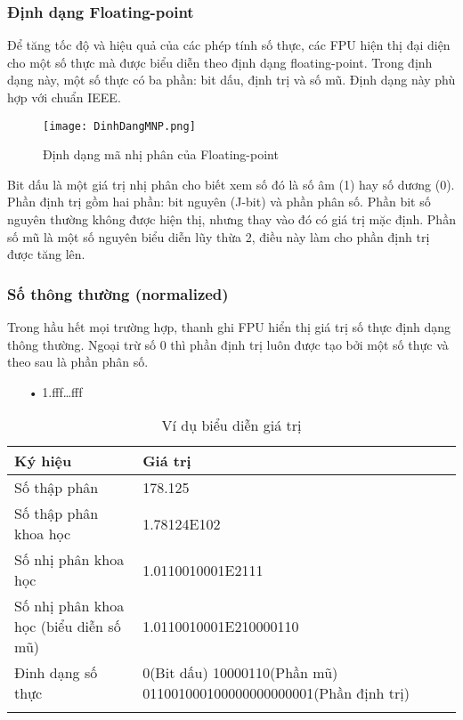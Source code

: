 		\subsubsection*{Định dạng Floating-point}
		Để tăng tốc độ và hiệu quả của các phép tính số thực, các FPU hiện thị đại diện cho một số thực mà được biểu diễn theo định dạng floating-point. Trong định dạng này, một số thực có ba phần: bit dấu, định trị và số mũ. Định dạng này phù hợp với chuẩn IEEE.
		\begin{center}
			\begin{figure}[htp]
				\begin{center}
					\texttt{[image: DinhDangMNP.png]}
				\end{center}
				\caption{Định dạng mã nhị phân của Floating-point  \protect\footnotemark}				
			\end{figure}		
		\end{center}		
		
		Bit dấu là một giá trị nhị phân cho biết xem số đó là số âm (1) hay số dương (0). Phần định trị gồm hai phần: bit nguyên (J-bit) và phần phân số. Phần bit số nguyên thường không được hiện thị, nhưng thay vào đó có giá trị mặc định. Phần số mũ là một số nguyên biểu diễn lũy thừa 2, điều này làm cho phần định trị được tăng lên.
		
		\subsubsection*{Số thông thường (normalized)}	
		Trong hầu hết mọi trường hợp, thanh ghi FPU hiển thị giá trị số thực định dạng thông thường. Ngoại trừ số 0 thì phần định trị luôn được tạo bởi một số thực và theo sau là phần phân số.
		\begin{itemize}
			\item[•	]1.fff…fff
		\end{itemize}
				
	\begin{longtable}{ | m{7cm} | m{9cm} | }
		\hline
				Ký hiệu & Giá trị\\
		\hline
		\hline
			Số thập phân	&178.125\\
		\hline	
			Số thập phân khoa học&	1.78124E102\\
		\hline	
			Số nhị phân khoa học	&1.0110010001E2111\\
		\hline	
			Số nhị phân khoa học (biểu diễn số mũ)	&1.0110010001E210000110\\
		\hline
			Đinh dạng số thực & 0(Bit dấu)  10000110(Phần mũ)	 011001000100000000000001(Phần định trị)\\
		\hline
			\caption{Ví dụ biểu diễn giá trị}
	\end{longtable}		
		
